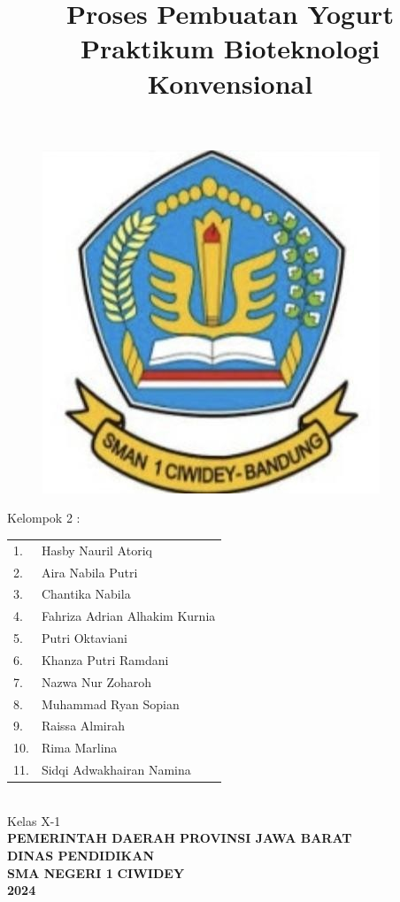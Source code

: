 \documentclass[a4paper,12pt, left=3cm,right=2cm,bottom=2cm, bahasa]{article}
\date{}
\title{Proses Pembuatan Yogurt\\ Praktikum Bioteknologi Konvensional}
\begin{document}
\maketitle
\thispagestyle{empty}
\begin{figure}[H]
    \centering
    \includegraphics[width=0.3\linewidth]{images/sman1.png}
\end{figure}

\begin{center}
    Kelompok 2 : \\
    \begin{tabular}{ll}
         1.& Hasby Nauril Atoriq  \\
         2.& Aira Nabila Putri\\
         3.& Chantika Nabila \\
         4.& Fahriza Adrian Alhakim Kurnia \\
         5.& Putri Oktaviani \\
         6.& Khanza Putri Ramdani \\
         7.& Nazwa Nur Zoharoh \\
         8.& Muhammad Ryan Sopian \\
         9.& Raissa Almirah \\
         10.& Rima Marlina \\
         11.& Sidqi Adwakhairan Namina \\

    \end{tabular}\\
    \vspace{0.5cm}
    Kelas X-1\\
    \vspace{1cm}
    \textbf{PEMERINTAH DAERAH PROVINSI JAWA BARAT}\\
    \textbf{DINAS PENDIDIKAN}\\
    \textbf{SMA NEGERI 1}
    \textbf{CIWIDEY}\\
    \textbf{2024}
\end{center}
\onehalfspacing{}
\setcounter{section}{1}
\pagebreak
\end{document}

